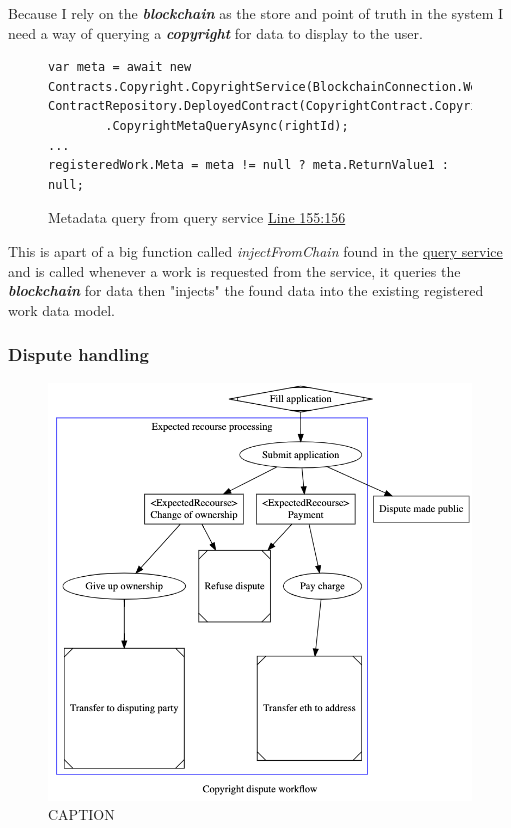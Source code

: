 \documentclass[12pt]{article}
\newcommand{\keyword}[1]{\textbf{\textit{#1}}}
\begin{document}
Because I rely on the \keyword{blockchain} as the store and point of truth in the system I need a way of querying a \keyword{copyright} for data to display to the user. 

\begin{figure}[H]
\caption{Metadata query from query service \href{https://github.com/MrHarrisonBarker/CRPL/blob/main/CRPL.Web/Services/QueryService.cs}{Line 155:156}}
\centering
\begin{lstlisting}[language=CSharp]
var meta = await new Contracts.Copyright.CopyrightService(BlockchainConnection.Web3(), ContractRepository.DeployedContract(CopyrightContract.Copyright).Address)
		.CopyrightMetaQueryAsync(rightId);
...
registeredWork.Meta = meta != null ? meta.ReturnValue1 : null;
\end{lstlisting}
\end{figure}

This is apart of a big function called \textit{injectFromChain} found in the \href{https://github.com/MrHarrisonBarker/CRPL/blob/main/CRPL.Web/Services/QueryService.cs}{query service} and is called whenever a work is requested from the service, it queries the \keyword{blockchain} for data then "injects" the found data into the existing registered work data model.

\subsubsection{Dispute handling}
\begin{figure}[H]
\caption{CAPTION}
\centering
\includegraphics[width=\textwidth,height=\textheight,keepaspectratio]{images/operational/dispute-workflow}
\end{figure}
\end{document}

